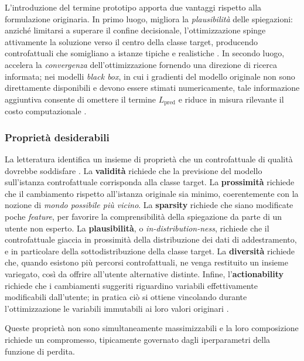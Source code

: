 L'introduzione del termine prototipo apporta due vantaggi rispetto alla formulazione originaria. In primo luogo, migliora la \textit{plausibilità} delle spiegazioni: anziché limitarsi a superare il confine decisionale, l'ottimizzazione spinge attivamente la soluzione verso il centro della classe target, producendo controfattuali che somigliano a istanze tipiche e realistiche \cite{vanlooveren2021counterfactualproto}. In secondo luogo, accelera la \textit{convergenza} dell'ottimizzazione fornendo una direzione di ricerca informata; nei modelli \textit{black box}, in cui i gradienti del modello originale non sono direttamente disponibili e devono essere stimati numericamente, tale informazione aggiuntiva consente di omettere il termine $L_{\text{pred}}$ e riduce in misura rilevante il costo computazionale \cite{vanlooveren2021counterfactualproto}.

\subsubsection{Proprietà desiderabili}

La letteratura identifica un insieme di proprietà che un controfattuale di qualità dovrebbe soddisfare \cite{vanlooveren2021counterfactualproto, wachter2017counterfactual}. La \textbf{validità} richiede che la previsione del modello sull'istanza controfattuale corrisponda alla classe target. La \textbf{prossimità} richiede che il cambiamento rispetto all'istanza originale sia minimo, coerentemente con la nozione di \textit{mondo possibile più vicino}. La \textbf{sparsity} richiede che siano modificate poche \textit{feature}, per favorire la comprensibilità della spiegazione da parte di un utente non esperto. La \textbf{plausibilità}, o \textit{in-distribution-ness}, richiede che il controfattuale giaccia in prossimità della distribuzione dei dati di addestramento, e in particolare della sottodistribuzione della classe target. La \textbf{diversità} richiede che, quando esistono più percorsi controfattuali, ne venga restituito un insieme variegato, così da offrire all'utente alternative distinte. Infine, l'\textbf{actionability} richiede che i cambiamenti suggeriti riguardino variabili effettivamente modificabili dall'utente; in pratica ciò si ottiene vincolando durante l'ottimizzazione le variabili immutabili ai loro valori originari \cite{vanlooveren2021counterfactualproto}.

Queste proprietà non sono simultaneamente massimizzabili e la loro composizione richiede un compromesso, tipicamente governato dagli iperparametri della funzione di perdita.

